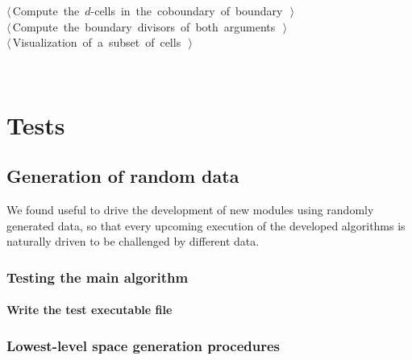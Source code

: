 \documentclass[11pt,oneside]{article}	%
\begin{document}
\begin{flushleft}
\begin{minipage}{\linewidth}
\begin{list}{}{}
\mbox{}\verb@@\hbox{$\langle\,$Compute the $d$-cells in the coboundary of boundary\nobreak\ {\footnotesize {}}$\,\rangle$}\verb@@\\
\mbox{}\verb@@\hbox{$\langle\,$Compute the boundary divisors of both arguments\nobreak\ {\footnotesize {}}$\,\rangle$}\verb@@\\
\mbox{}\verb@@\hbox{$\langle\,$Visualization of a subset of cells\nobreak\ {\footnotesize {}}$\,\rangle$}\verb@@\\
\mbox{}\verb@@{\NWsep}
\end{list}
\vspace{-2ex}
\end{minipage}\\[4ex]
\end{flushleft}

\section{Tests}
\subsection{Generation of random data}

We found useful to drive the development of new modules using randomly generated data, so that every upcoming execution of the developed algorithms is naturally driven to be challenged by different data.

\subsubsection{Testing the main algorithm}

\paragraph{Write the test executable file}




\subsubsection{Lowest-level space generation procedures}
\end{document}
